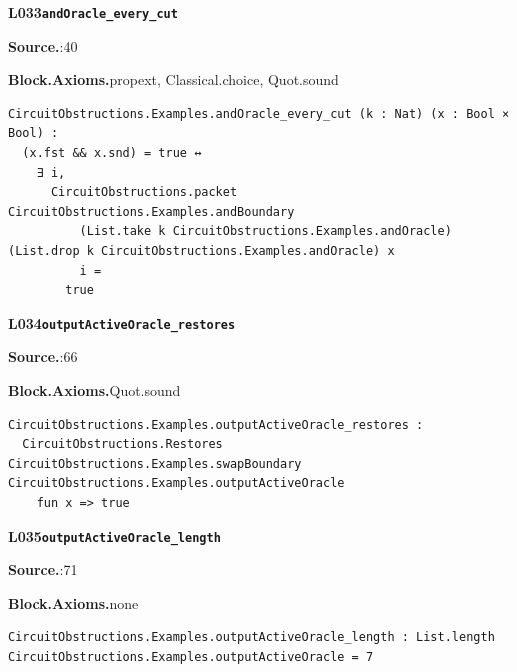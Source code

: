 \par\medskip\noindent\begin{minipage}{\textwidth}
{\small\bfseries L033\enspace\texttt{andOracle\_every\_cut}\par}
{\footnotesize\raggedright\textbf{Source.}\enspace{}:40\par
\textbf{Block.}\quad\textbf{Axioms.}\enspace propext, Classical.choice, Quot.sound\par}\nopagebreak
\begin{lstlisting}
CircuitObstructions.Examples.andOracle_every_cut (k : Nat) (x : Bool × Bool) :
  (x.fst && x.snd) = true ↔
    ∃ i,
      CircuitObstructions.packet CircuitObstructions.Examples.andBoundary
          (List.take k CircuitObstructions.Examples.andOracle) (List.drop k CircuitObstructions.Examples.andOracle) x
          i =
        true
\end{lstlisting}
\end{minipage}\par

\par\medskip\noindent\begin{minipage}{\textwidth}
{\small\bfseries L034\enspace\texttt{outputActiveOracle\_restores}\par}
{\footnotesize\raggedright\textbf{Source.}\enspace{}:66\par
\textbf{Block.}\quad\textbf{Axioms.}\enspace Quot.sound\par}\nopagebreak
\begin{lstlisting}
CircuitObstructions.Examples.outputActiveOracle_restores :
  CircuitObstructions.Restores CircuitObstructions.Examples.swapBoundary CircuitObstructions.Examples.outputActiveOracle
    fun x => true
\end{lstlisting}
\end{minipage}\par

\par\medskip\noindent\begin{minipage}{\textwidth}
{\small\bfseries L035\enspace\texttt{outputActiveOracle\_length}\par}
{\footnotesize\raggedright\textbf{Source.}\enspace{}:71\par
\textbf{Block.}\quad\textbf{Axioms.}\enspace none\par}\nopagebreak
\begin{lstlisting}
CircuitObstructions.Examples.outputActiveOracle_length : List.length CircuitObstructions.Examples.outputActiveOracle = 7
\end{lstlisting}
\end{minipage}\par

